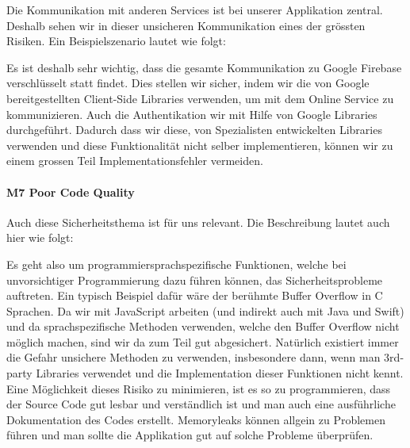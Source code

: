 Die Kommunikation mit anderen Services ist bei unserer Applikation zentral. Deshalb sehen wir in dieser unsicheren Kommunikation eines der grössten Risiken. Ein Beispielszenario lautet wie folgt: \textit{}

Es ist deshalb sehr wichtig, dass die gesamte Kommunikation zu Google Firebase verschlüsselt statt findet. Dies stellen wir sicher, indem wir die von Google bereitgestellten Client-Side Libraries verwenden, um mit dem Online Service zu kommunizieren. Auch die Authentikation wir mit Hilfe von Google Libraries durchgeführt. Dadurch dass wir diese, von Spezialisten entwickelten Libraries verwenden und diese Funktionalität nicht selber implementieren, können wir zu einem grossen Teil Implementationsfehler vermeiden.

\paragraph{M7 Poor Code Quality}
Auch diese Sicherheitsthema ist für uns relevant. Die Beschreibung lautet auch hier wie folgt:
\textit{}

Es geht also um programmiersprachspezifische Funktionen, welche bei unvorsichtiger Programmierung dazu führen können, das Sicherheitsprobleme auftreten. Ein typisch Beispiel dafür wäre der berühmte Buffer Overflow in C Sprachen. Da wir mit JavaScript arbeiten (und indirekt auch mit Java und Swift) und da sprachspezifische Methoden verwenden, welche den Buffer Overflow nicht möglich machen, sind wir da zum Teil gut abgesichert. Natürlich existiert immer die Gefahr unsichere Methoden zu verwenden, insbesondere dann, wenn man 3rd-party Libraries verwendet und die Implementation dieser Funktionen nicht kennt. 
Eine Möglichkeit dieses Risiko zu minimieren, ist es so zu programmieren, dass der Source Code gut lesbar und verständlich ist und man auch eine ausführliche Dokumentation des Codes erstellt. 
Memoryleaks können allgein zu Problemen führen und man sollte die Applikation gut auf solche Probleme überprüfen.






